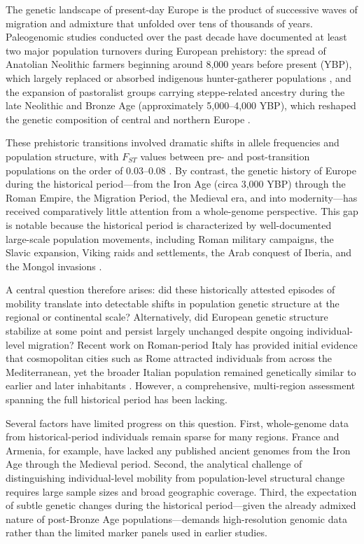 \documentclass[11pt,a4paper]{article}
\begin{document}
The genetic landscape of present-day Europe is the product of successive waves of migration and admixture that unfolded over tens of thousands of years. Paleogenomic studies conducted over the past decade have documented at least two major population turnovers during European prehistory: the spread of Anatolian Neolithic farmers beginning around 8,000 years before present (YBP), which largely replaced or absorbed indigenous hunter-gatherer populations \citep{lazaridis2014ancient, haak2015massive}, and the expansion of pastoralist groups carrying steppe-related ancestry during the late Neolithic and Bronze Age (approximately 5,000--4,000 YBP), which reshaped the genetic composition of central and northern Europe \citep{allentoft2015population, olalde2018beaker, haak2015massive}.

These prehistoric transitions involved dramatic shifts in allele frequencies and population structure, with $F_{ST}$ values between pre- and post-transition populations on the order of 0.03--0.08 \citep{mathieson2015genome, lazaridis2014ancient}. By contrast, the genetic history of Europe during the historical period---from the Iron Age (circa 3,000 YBP) through the Roman Empire, the Migration Period, the Medieval era, and into modernity---has received comparatively little attention from a whole-genome perspective. This gap is notable because the historical period is characterized by well-documented large-scale population movements, including Roman military campaigns, the Slavic expansion, Viking raids and settlements, the Arab conquest of Iberia, and the Mongol invasions \citep{antonio2019ancient, margaryan2020population}.

A central question therefore arises: did these historically attested episodes of mobility translate into detectable shifts in population genetic structure at the regional or continental scale? Alternatively, did European genetic structure stabilize at some point and persist largely unchanged despite ongoing individual-level migration? Recent work on Roman-period Italy has provided initial evidence that cosmopolitan cities such as Rome attracted individuals from across the Mediterranean, yet the broader Italian population remained genetically similar to earlier and later inhabitants \citep{antonio2019ancient}. However, a comprehensive, multi-region assessment spanning the full historical period has been lacking.

Several factors have limited progress on this question. First, whole-genome data from historical-period individuals remain sparse for many regions. France and Armenia, for example, have lacked any published ancient genomes from the Iron Age through the Medieval period. Second, the analytical challenge of distinguishing individual-level mobility from population-level structural change requires large sample sizes and broad geographic coverage. Third, the expectation of subtle genetic changes during the historical period---given the already admixed nature of post-Bronze Age populations---demands high-resolution genomic data rather than the limited marker panels used in earlier studies.
\end{document}
